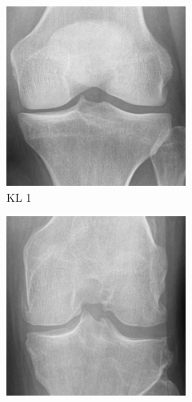 \documentclass[11pt,spanish,listoffigures,listoftables]{tfgetsinf}
\begin{document}
\begin{figure}[htbp]
\begin{subfigure}[b]{0.19\textwidth}
        \includegraphics[width=\textwidth]{knee_1.png}
        \caption{KL 1}
        \label{fig:knee1}
    \end{subfigure}
    \hfill
    \begin{subfigure}[b]{0.19\textwidth}
        \includegraphics[width=\textwidth]{knee_2.png}

\end{subfigure}
\end{figure}
\end{document}
